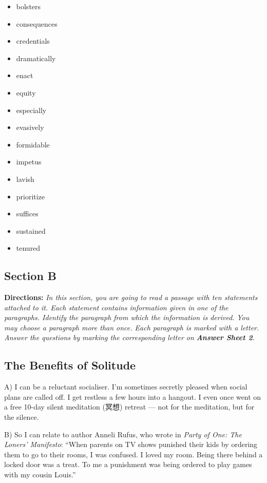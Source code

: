 \documentclass[UTF8,11pt]{ctexart}
\begin{document}
\begin{itemize}[leftmargin=2em,itemsep=.2em,topsep=.4em]\item[A.] bolsters
\item[B.] consequences
\item[C.] credentials
\item[D.] dramatically
\item[E.] enact
\item[F.] equity
\item[G.] especially
\item[H.] evasively
\item[I.] formidable
\item[J.] impetus
\item[K.] lavish
\item[L.] prioritize
\item[M.] suffices
\item[N.] sustained
\item[O.] tenured
\end{itemize}

\subsection*{\textbf{Section B}}


\textbf{Directions:} \textit{In this section, you are going to read a passage with ten statements attached to it. Each statement} \textit{contains information given in one of the paragraphs. Identify the paragraph from which the information is derived.} \textit{You may choose a paragraph more than once. Each paragraph is marked with a letter. Answer the questions by} \textit{marking the corresponding letter on }\textbf{\textit{Answer Sheet 2}}\textit{.}


\subsection*{\textbf{The Benefits of Solitude}}


A) I can be a reluctant socialiser. I’m sometimes secretly pleased when social plans are called off. I get restless a few hours into a hangout. I even once went on a free 10-day silent meditation (冥想) retreat — not for the meditation, but for the silence.


B) So I can relate to author Anneli Rufus, who wrote in \textit{Party of One: The Loners’ Manifesto}: “When parents on TV shows punished their kids by ordering them to go to their rooms, I was confused. I loved my room. Being there behind a locked door was a treat. To me a punishment was being ordered to play games with my cousin Louis.”
\end{document}
